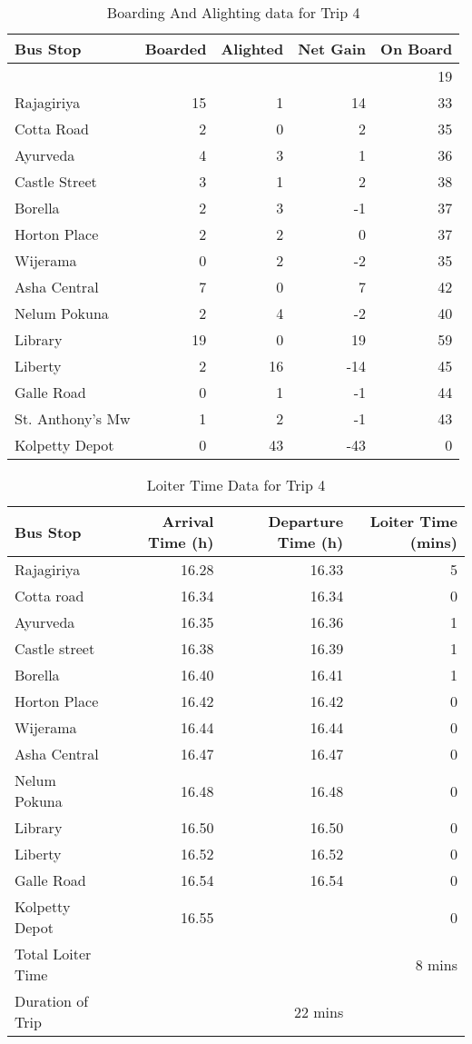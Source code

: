 \begin{table}
\centering
\begin{tabular}{|l|r|r|r|r|}
\hline
Bus Stop & Boarded & Alighted & Net Gain & On Board \\
\hline
 & & & & 19 \\
Rajagiriya	&15	&1	&14	&33\\
Cotta Road	&2	&0	&2	&35\\
Ayurveda	&4	&3	&1	&36\\
Castle Street	&3	&1	&2	&38\\
Borella	&2	&3	&-1	&37\\
Horton Place	&2	&2	&0	&37\\
Wijerama	&0	&2	&-2	&35\\
Asha Central	&7	&0	&7	&42\\
Nelum Pokuna	&2	&4	&-2	&40\\
Library	&19	&0	&19	&59\\
Liberty	&2	&16	&-14	&45\\
Galle Road	&0	&1	&-1	&44\\
\rowcolor[gray]{0.7}
St. Anthony's Mw	&1	&2	&-1	&43\\
Kolpetty Depot	&0	&43	&-43	&0\\
\hline
\end{tabular}
\caption{Boarding And Alighting data for Trip 4}
\label{table-trip4-BoardingAndAlighting}
\end{table}

\begin{table}
\centering
\begin{tabular}{|l|r|r|r|}
\hline
Bus Stop & Arrival Time (h) & Departure Time (h) & Loiter Time (mins) \\
\hline
Rajagiriya	&16.28	&16.33	&5\\
Cotta road	&16.34	&16.34	&0\\
Ayurveda	&16.35	&16.36	&1\\
Castle street	&16.38	&16.39	&1\\
Borella	&16.40	&16.41	&1\\
Horton Place	&16.42	&16.42	&0\\
Wijerama	&16.44	&16.44	&0\\
Asha Central	&16.47	&16.47	&0\\
Nelum Pokuna	&16.48	&16.48	&0\\
Library	&16.50	&16.50	&0\\
Liberty	&16.52	&16.52	&0\\
Galle Road	&16.54	&16.54	&0\\
Kolpetty Depot	&16.55	&	&0\\
\hline
Total Loiter Time & & & 8 mins \\
Duration of Trip & & 22 mins & \\
\hline
\end{tabular}
\caption{Loiter Time Data for Trip 4}
\label{table-trip4-LoiterTime}
\end{table}


